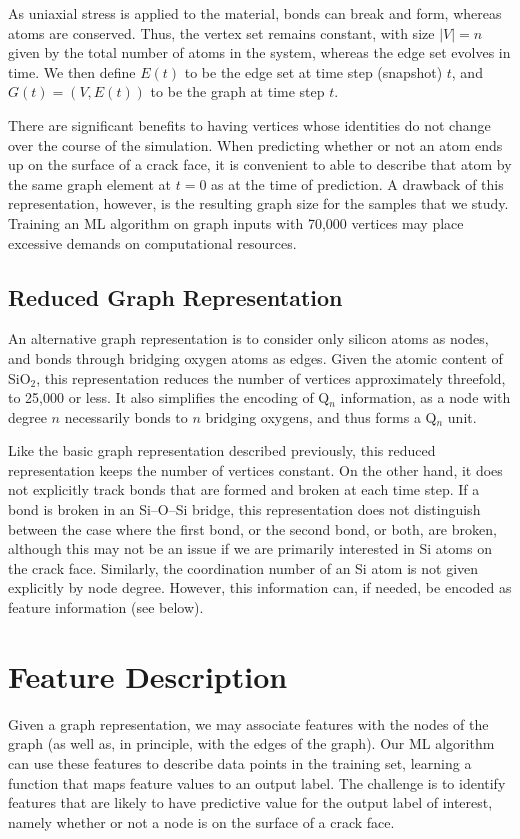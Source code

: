 As uniaxial stress is applied to the material, bonds can break and form, whereas atoms are conserved.  Thus, the vertex set remains constant, with size $|V|=n$ given by the total number of atoms in the system, whereas the edge set evolves in time.  We then define $E(t)$ to be the edge set at time step (snapshot) $t$, and $G(t) = (V,E(t))$ to be the graph at time step $t$.

There are significant benefits to having vertices whose identities do not change over the course of the simulation.  When predicting whether or not an atom ends up on the surface of a crack face, it is convenient to able to describe that atom by the same graph element at $t=0$ as at the time of prediction.  A drawback of this representation, however, is the resulting graph size for the samples that we study.  Training an ML algorithm on graph inputs with 70,000 vertices may place excessive demands on computational resources.
    
\subsection{Reduced Graph Representation} 

An alternative graph representation is to consider only silicon atoms as nodes, and bonds through bridging oxygen atoms as edges.  Given the atomic content of SiO$_2$, this representation reduces the number of vertices approximately threefold, to 25,000 or less.  It also simplifies the encoding of Q$_n$ information, as a node with degree $n$ necessarily bonds to $n$ bridging oxygens, and thus forms a Q$_n$ unit.

Like the basic graph representation described previously, this reduced representation keeps the number of vertices constant.  On the other hand, it does not explicitly track bonds that are formed and broken at each time step. If a bond is broken in an Si--O--Si bridge, this representation does not distinguish between the case where the first bond, or the second bond, or both, are broken, although this may not be an issue if we are primarily interested in Si atoms on the crack face.  Similarly, the coordination number of an Si atom is not given explicitly by node degree.  However, this information can, if needed, be encoded as feature information (see below).


\section{Feature Description}
\label{subsec: Features}
Given a graph representation, we may associate features with the nodes of the graph (as well as, in principle, with the edges of the graph).  Our ML algorithm can use these features to describe data points in the training set, learning a function that maps feature values to an output label.  The challenge is to identify features that are likely to have predictive value for the output label of interest, namely whether or not a node is on the surface of a crack face.


